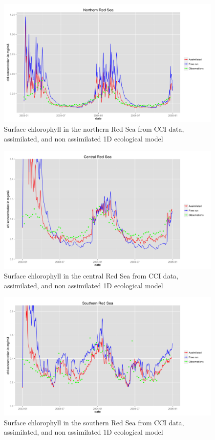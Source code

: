 \begin{figure}
    \centering
    \includegraphics[scale=.12]{figures/chl_models2.png}
    \caption{Surface chlorophyll in the northern Red Sea from CCI data,
             assimilated, and non assimilated 1D ecological model}
    \label{chl_models2}
\end{figure}

\begin{figure}
    \centering
    \includegraphics[scale=.12]{figures/chl_models1.png}
    \caption{Surface chlorophyll in the central Red Sea from CCI data,
             assimilated, and non assimilated 1D ecological model}
    \label{chl_models1}
\end{figure}

\begin{figure}
    \centering
    \includegraphics[scale=.12]{figures/chl_models3.png}
    \caption{Surface chlorophyll in the southern Red Sea from CCI data,
             assimilated, and non assimilated 1D ecological model}
    \label{chl_models3}
\end{figure}

